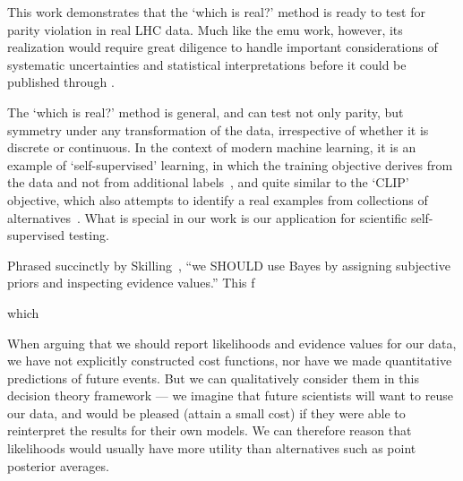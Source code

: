 This work demonstrates that the `which is real?' method is ready to test for
parity violation in real LHC data.
Much like the emu work, however, its realization would require great diligence
to handle important considerations of systematic uncertainties and statistical
interpretations before it could be published through \atlas.

The `which is real?' method is general, and can test not only parity, but
symmetry under any transformation of the data, irrespective of whether it is
discrete or continuous.
In the context of modern machine learning, it is an example of
`self-supervised' learning, in which the training objective derives from the
data and not from additional labels~\cite{
Noroozi2016jigsaw,
multitaskself2017,
devlin2019bert
}, and quite similar to the `CLIP' objective, which also attempts to identify
a real examples from collections of alternatives~\cite{pmlr-v139-radford21a}.
What is special in our work is our application for scientific self-supervised
testing.



Phrased succinctly by Skilling~\cite{skilling2008rant},
``we SHOULD use Bayes by assigning subjective priors and inspecting evidence
values.''
This f



which


When arguing that we should report likelihoods and evidence values for our
data, we have not explicitly constructed cost functions, nor have we made
quantitative predictions of future events.
But we can qualitatively consider them in this decision theory framework ---
we imagine that future scientists will want to reuse our data, and would be
pleased (attain a small cost) if they were able to reinterpret the results for
their own models.
We can therefore reason that likelihoods would usually have more utility than
alternatives such as point posterior averages.


